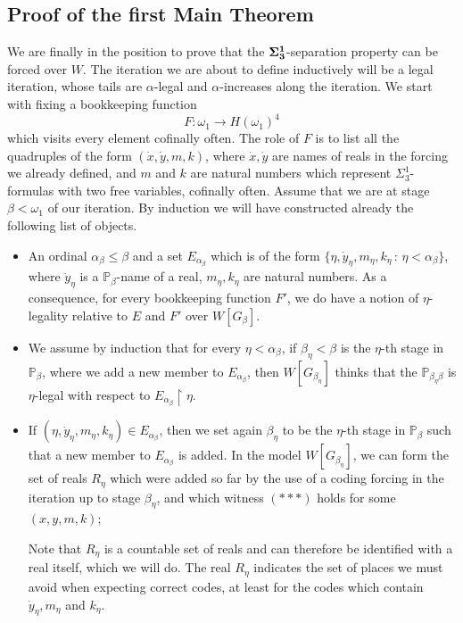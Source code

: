 \documentclass[a4paper,11pt]{article}
\newcommand{\forceP}{\mathbb{P}}
\begin{document}
\subsection{Proof of the first Main Theorem}
We are finally in the position to prove that the $\bf{\Sigma^1_3}$-separation property can be forced over $W$.
The iteration we are about to define inductively will be a legal iteration, whose tails are $\alpha$-legal and $\alpha$-increases along the iteration. We start with fixing a bookkeeping function \[ F: \omega_1 \rightarrow H(\omega_1)^4 \]
which visits every element cofinally often. The role of $F$ is to list all the quadruples of the form $(\dot{x}, \dot{y},m,k)$, where $\dot{x}, \dot{y}$ are names of reals in the forcing we already defined, and $m$ and $k$ are natural numbers which represent  $\Sigma^1_3$-formulas with two free variables, cofinally often.
Assume that we are at stage $\beta < \omega_1$ of our iteration.  By induction we will have constructed already the following list of objects.
\begin{itemize}

\item An ordinal $\alpha_{\beta} \le \beta$ and a set $E_{\alpha_{\beta}}$ which is of the form $\{\eta ,\dot{y}_{\eta}, m_{\eta},k_{\eta} \, : \, \eta < \alpha_{\beta} \}$, where $\dot{y}_{\eta}$ is a $\forceP_{\beta}$-name of a real, $m_\eta, k_{\eta}$ are natural numbers. As a consequence, for every bookkeeping function $F'$, we do have a notion of $\eta$-legality relative to $E$ and $F'$ over $W[G_{\beta}]$.


\item We assume by induction that for every $\eta < \alpha_{\beta}$, if $\beta_{\eta}< \beta$ is the $\eta$-th stage in $\forceP_{\beta}$, where we add a new member to $E_{\alpha_{\beta}}$, then $W[G_{\beta_{\eta}}]$ thinks that the $\forceP_{\beta_{\eta} \beta}$ is $\eta$-legal with respect to $E_{\alpha_{\beta}} \upharpoonright \eta$.

\item If $(\eta, \dot{y}_{\eta},m_{\eta},k_{\eta}) \in E_{\alpha_{\beta}}$, then we set again $\beta_{\eta}$ to be the $\eta$-th stage in $\forceP_{\beta}$ such that a new member to $E_{\alpha_{\beta}}$ is added. In the model $W[G_{\beta_{\eta}}]$, we can form the set of reals $R_{\eta}$ which were added so far by the use of a coding forcing in the iteration up to stage $\beta_{\eta}$, and  which witness $({\ast} {\ast} {\ast})$ holds for some $(x,y,m,k)$; 

Note that $R_{\eta}$ is a countable set of reals and can therefore be identified with a real itself, which we will do. The real $R_{\eta}$ indicates the set of places we must avoid when expecting correct codes, at least for the codes which contain $\dot{y}_{\eta},m_{\eta}$ and $k_{\eta}$.

\end{itemize}
\end{document}
